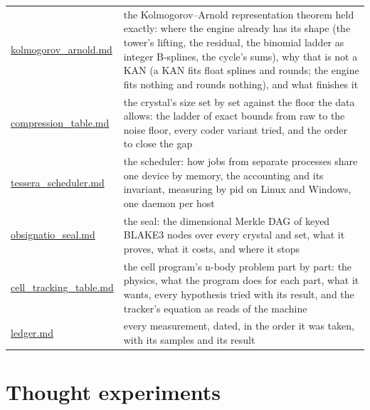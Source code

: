 {\begin{longtable}{>{\RaggedRight\arraybackslash}p{}>{\RaggedRight\arraybackslash}p{}}
\hyperref[chap:kolmogorov-arnold]{kolmogorov\_\allowbreak{}arnold.md} & the Kolmogorov–Arnold representation theorem held exactly: where the engine already has its shape (the tower's lifting, the residual, the binomial ladder as integer B-splines, the cycle's sums), why that is not a KAN (a KAN fits float splines and rounds; the engine fits nothing and rounds nothing), and what finishes it \\
\hyperref[chap:compression-table]{compression\_\allowbreak{}table.md} & the crystal's size set by set against the floor the data allows: the ladder of exact bounds from raw to the noise floor, every coder variant tried, and the order to close the gap \\
\hyperref[chap:tessera-scheduler]{tessera\_\allowbreak{}scheduler.md} & the scheduler: how jobs from separate processes share one device by memory, the accounting and its invariant, measuring by pid on Linux and Windows, one daemon per host \\
\hyperref[chap:obsignatio-seal]{obsignatio\_\allowbreak{}seal.md} & the seal: the dimensional Merkle DAG of keyed BLAKE3 nodes over every crystal and set, what it proves, what it costs, and where it stops \\
\hyperref[chap:cell-tracking-table]{cell\_\allowbreak{}tracking\_\allowbreak{}table.md} & the cell program's n-body problem part by part: the physics, what the program does for each part, what it wants, every hypothesis tried with its result, and the tracker's equation as reads of the machine \\
\hyperref[chap:ledger]{ledger.md} & every measurement, dated, in the order it was taken, with its samples and its result \\
\bottomrule
\end{longtable}
}

\section{\texorpdfstring{Thought experiments}{Thought experiments}}

